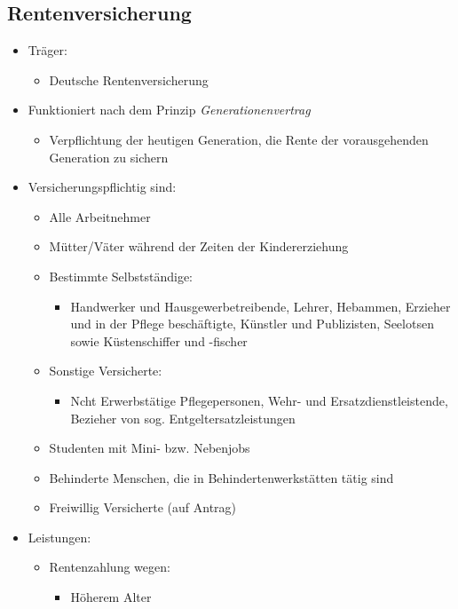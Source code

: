 \documentclass[a4paper, 12pt]{report}
\begin{document}
\begin{multicols}{2}
\subsection{Rentenversicherung}

\begin{itemize}
    \item Träger:
	\begin{itemize}
	    \item Deutsche Rentenversicherung
	\end{itemize}
    \item Funktioniert nach dem Prinzip \emph{Generationenvertrag}
	\begin{itemize}
	    \item Verpflichtung der heutigen Generation, die Rente der
		vorausgehenden Generation zu sichern
	\end{itemize}
    \item Versicherungspflichtig sind:
	\begin{itemize}
	    \item Alle Arbeitnehmer
	    \item Mütter/Väter während der Zeiten der Kindererziehung
	    \item Bestimmte Selbstständige:
		\begin{itemize}
		    \item Handwerker und Hausgewerbetreibende, Lehrer, Hebammen,
			Erzieher und in der Pflege beschäftigte, Künstler und
			Publizisten, Seelotsen sowie Küstenschiffer und -fischer
		\end{itemize}
	    \item Sonstige Versicherte:
		\begin{itemize}
		    \item Ncht Erwerbstätige Pflegepersonen, Wehr- und
			Ersatzdienstleistende, Bezieher von sog.
			Entgeltersatzleistungen
		\end{itemize}
	    \item Studenten mit Mini- bzw. Nebenjobs
	    \item Behinderte Menschen, die in Behindertenwerkstätten tätig sind
	    \item Freiwillig Versicherte (auf Antrag)
	\end{itemize}
    \item Leistungen:
	\begin{itemize}
	    \item Rentenzahlung wegen:
		\begin{itemize}
		    \item Höherem Alter

\end{itemize}
\end{itemize}
\end{itemize}
\end{multicols}
\end{document}
